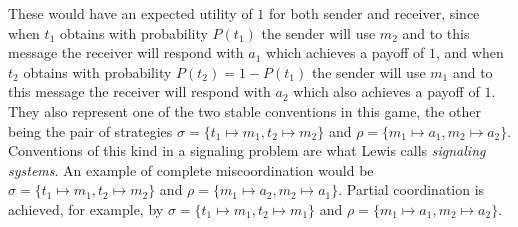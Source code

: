 \documentclass[a4paper]{article}
\begin{document}
These would have an expected utility of $1$ for both sender and receiver, since when $t_1$ obtains with probability $P(t_1)$ the sender will use $m_2$ and to this message the receiver will respond with $a_1$ which achieves a payoff of $1$, and when $t_2$ obtains with probability $P(t_2) = 1-P(t_1)$ the sender will use $m_1$ and to this message the receiver will respond with $a_2$ which also achieves a payoff of $1$.
They also represent one of the two stable conventions in this game, the other being the pair of strategies $\sigma = \lbrace t_1 \mapsto m_1, t_2 \mapsto m_2 \rbrace$ and $\rho = \lbrace m_1 \mapsto a_1, m_2 \mapsto a_2 \rbrace$.
Conventions of this kind in a signaling problem are what Lewis calls \emph{signaling systems}.
An example of complete miscoordination would be $\sigma = \lbrace t_1 \mapsto m_1, t_2 \mapsto m_2 \rbrace$ and $\rho = \lbrace m_1 \mapsto a_2, m_2 \mapsto a_1 \rbrace$.
Partial coordination is achieved, for example, by $\sigma = \lbrace t_1 \mapsto m_1, t_2 \mapsto m_1 \rbrace$ and $\rho = \lbrace m_1 \mapsto a_1, m_2 \mapsto a_2 \rbrace$.

\end{document}
